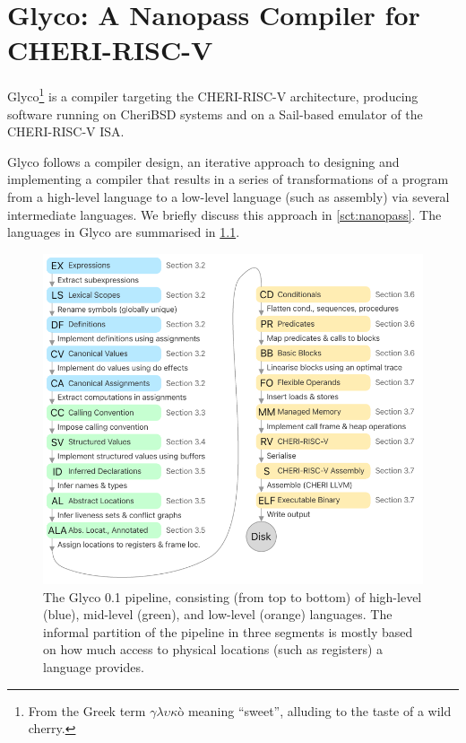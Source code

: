 \documentclass[main.tex]{subfiles}
\begin{document}
\onlyinsubfile{\mainmatter{}}

\chapter{Glyco: A Nanopass Compiler for CHERI-RISC-V} \label{ch:glyco}
Glyco\footnote{From the Greek term $\gamma\lambda\upsilon\kappa{}\text{ò}$ meaning \enquote{sweet}, alluding to the taste of a wild cherry.} is a compiler targeting the CHERI-RISC-V architecture, producing software running on CheriBSD systems and on a Sail-based emulator of the CHERI-RISC-V ISA.

Glyco follows a  compiler design, an iterative approach to designing and implementing a compiler that results in a series of transformations of a program from a high-level language to a low-level language (such as assembly) via several intermediate languages. We briefly discuss this approach in \cref{sct:nanopass}. The languages in Glyco are summarised in \cref{fig:pipeline01}.

\begin{figure}
	\centering
	\includegraphics{Images/Pipeline v0.1.pdf}
	\caption{The Glyco 0.1 pipeline, consisting (from top to bottom) of high-level (blue), mid-level (green), and low-level (orange) languages. The informal partition of the pipeline in three segments is mostly based on how much access to physical locations (such as registers) a language provides.}
	\label{fig:pipeline01}
\end{figure}
\end{document}
